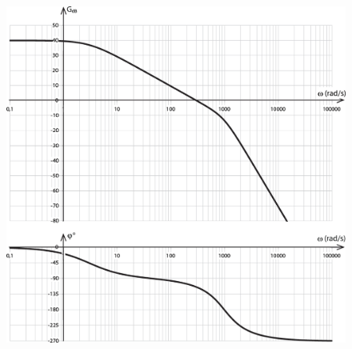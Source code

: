 \documentclass[10pt,fleqn]{article} %
\begin{document}
\begin{figure}[H]
\centering
\includegraphics[width=\linewidth]{dr_Q33}
\end{figure}
\end{document}
